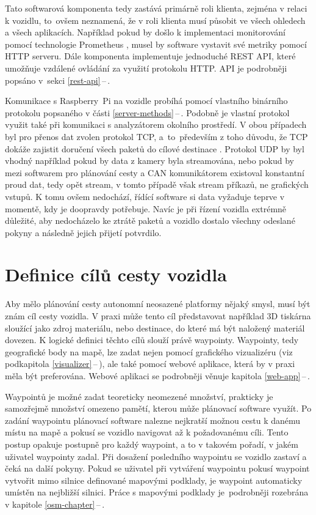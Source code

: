 \documentclass[czech, bachelor]{diploma}
\newcommand{\peteref}[1]{\ref{#1}\,--\,\nameref{#1}}
\begin{document}
Tato softwarová komponenta tedy zastává primárně roli klienta, zejména v relaci k vozidlu, to~ovšem neznamená, že v roli klienta
musí působit ve všech ohledech a všech aplikacích. Například pokud by došlo k implementaci monitorování pomocí technologie
Prometheus \cite{prometheus-source}, musel by software vystavit své metriky pomocí HTTP serveru. Dále komponenta implementuje
jednoduché REST API, které umožňuje vzdálené ovládání za využití protokolu HTTP. API je podrobněji popsáno v~sekci
\peteref{rest-api}.

Komunikace s Raspberry~Pi na vozidle probíhá pomocí vlastního binárního protokolu popsaného v části \peteref{server-methods}.
Podobně je vlastní protokol využit také při komunikaci s analyzátorem okolního prostředí. V obou případech byl pro přenos dat
zvolen protokol TCP, a~to~především z toho důvodu, že TCP dokáže zajistit doručení všech paketů do cílové destinace \cite{
tcp-source}. Protokol UDP \cite{udp-source} by byl vhodný například pokud by data z kamery byla streamována, nebo pokud by mezi
softwarem pro plánování cesty a CAN komunikátorem existoval konstantní proud dat, tedy opět stream, v tomto případě však stream
příkazů, ne grafických vstupů. K tomu ovšem nedochází, řídící software si data vyžaduje teprve v momentě, kdy je doopravdy
potřebuje. Navíc je při řízení vozidla extrémně důležité, aby nedocházelo ke ztrátě paketů a vozidlo dostalo všechny odeslané
pokyny a následně jejich přijetí potvrdilo.

\section{Definice cílů cesty vozidla} \label{target-definition}

Aby mělo plánování cesty autonomní neosazené platformy nějaký smysl, musí být znám cíl cesty vozidla. V praxi může tento cíl
představovat například 3D tiskárna sloužící jako zdroj materiálu, nebo destinace, do které má být naložený materiál dovezen.
K logické definici těchto cílů slouží právě waypointy. Waypointy, tedy geografické body na mapě, lze zadat nejen pomocí grafického
vizualizéru (viz podkapitola \peteref{visualizer}), ale také pomocí webové aplikace, která by v praxi měla být preferována.
Webové aplikaci se podrobněji věnuje kapitola \peteref{web-app}.

Waypointů je možné zadat teoreticky neomezené množství, prakticky je samozřejmě množství omezeno pamětí, kterou může plánovací
software využít. Po zadání waypointu plánovací software nalezne nejkratší možnou cestu k danému místu na mapě a pokusí se vozidlo
navigovat až k požadovanému cíli. Tento postup opakuje postupně pro každý waypoint, a to v takovém pořadí, v jakém uživatel
waypointy zadal. Při dosažení posledního waypointu se vozidlo zastaví a čeká na další pokyny. Pokud se uživatel při vytváření
waypointu pokusí waypoint vytvořit mimo silnice definované mapovými podklady, je waypoint automaticky umístěn na nejbližší
silnici. Práce s mapovými podklady je~podrobněji rozebrána v kapitole \peteref{osm-chapter}.
\end{document}
